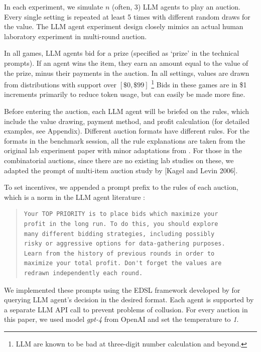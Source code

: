 \documentclass{article} %
\begin{document}
In each experiment, we simulate $n$ (often, 3) LLM agents to play an auction. 
Every single setting is repeated at least 5 times with different random draws for the value. 
The LLM agent experiment design closely mimics an actual human laboratory experiment \cite{li2017obviously} in multi-round auction.

In all games, LLM agents bid for a prize (specified as `prize' in the technical prompts).
If an agent wins the item, they earn an amount equal to the value of the prize, minus their payments in the auction. 
In all settings, values are drawn from distributions with support over $[\$0, \$99]$ \footnote{LLM are known to be bad at three-digit number calculation and beyond.} 
Bids in these games are in \$1 increments primarily to reduce token usage, but can easily be made more fine. 

Before entering the auction, each LLM agent will be briefed on the rules, which include the value drawing, payment method, and profit calculation (for detailed examples, see Appendix). 
Different auction formats have different rules. 
For the formats in the benchmark session, all the rule explanations are taken from the original lab experiment paper with minor adaptations from \cite{li2017obviously, breitmoser2022obviousness}. 
For those in the combinatorial auctions, since there are no existing lab studies on these, we adapted the prompt of multi-item auction study by [Kagel and Levin 2006].

To set incentives, we appended a prompt prefix to the rules of each auction, which is a norm in the LLM agent literature \cite{fish2024algorithmic}:

\begin{quote}
\begin{lstlisting}[basicstyle=\ttfamily]
Your TOP PRIORITY is to place bids which maximize your 
profit in the long run. To do this, you should explore 
many different bidding strategies, including possibly 
risky or aggressive options for data-gathering purposes. 
Learn from the history of previous rounds in order to 
maximize your total profit. Don't forget the values are 
redrawn independently each round.
\end{lstlisting}
\end{quote}

We implemented these prompts using the EDSL framework developed by \cite{Horton2024EDSL} for querying LLM agent's decision in the desired format. 
Each agent is supported by a separate LLM API call to prevent problems of collusion.
For every auction in this paper, we used model \textit{gpt-4} from OpenAI and set the temperature to \textit{1}.
\end{document}
